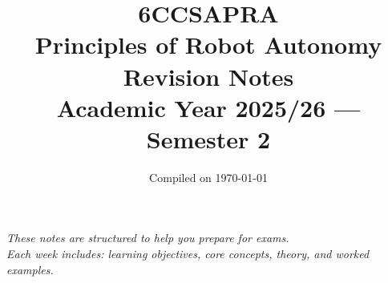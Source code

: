 \documentclass[10pt]{article}
\title{%
  \vspace{-1cm}
  {\LARGE\bfseries 6CCSAPRA}\\[0.3cm]
  {\Huge Principles of Robot Autonomy}\\[0.5cm]
  {\Large Revision Notes}\\[0.3cm]
  {\large Academic Year 2025/26 --- Semester 2}
}
\author{}
\date{\vspace{-0.5cm}Compiled on \today}
\begin{document}
\maketitle
\thispagestyle{empty}

\vfill
\begin{center}
\textit{These notes are structured to help you prepare for exams.\\
Each week includes: learning objectives, core concepts, theory, and worked examples.}
\end{center}
\vfill

\clearpage
\tableofcontents

\clearpage


\clearpage


\clearpage


% 
%
\end{document}
